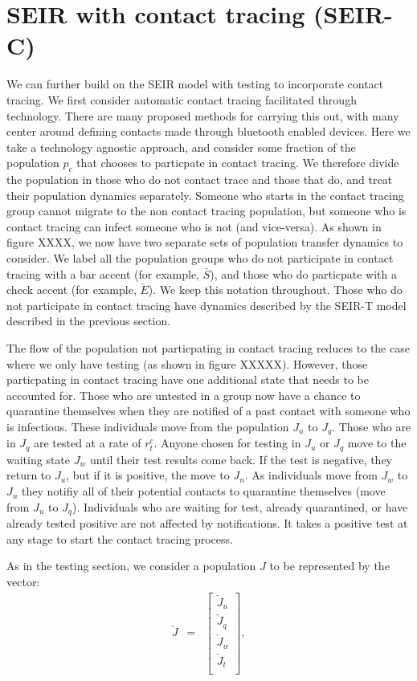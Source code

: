 \documentclass[notitlepage, superscriptaddress]{revtex4-2}
\begin{document}
\section{SEIR with contact tracing (SEIR-C)}
We can further build on the SEIR model with testing to incorporate contact tracing. We first consider automatic contact tracing facilitated through technology. There are many proposed methods for carrying this out, with many center around defining contacts made through bluetooth enabled devices. Here we take a technology agnostic approach, and consider some fraction of the population $p_{c}$ that chooses to particpate in contact tracing. We therefore divide the population in those who do not contact trace and those that do, and treat their population dynamics separately. Someone who starts in the contact tracing group cannot migrate to the non contact tracing population, but someone who is contact tracing can infect someone who is not (and vice-versa). As shown in figure XXXX, we now have two separate sets of population transfer dynamics to consider. We label all the population groups who do not participate in contact tracing with a bar accent (for example, $\bar{S}$), and those who do particpate with a check accent (for example, $\check{E}$). We keep this notation throughout. Those who do not participate in contact tracing have dynamics described by the SEIR-T model described in the previous section.

The flow of the population not particpating in contact tracing reduces to the case where we only have testing (as shown in figure XXXXX). However, those particpating in contact tracing have one additional state that needs to be accounted for. Those who are untested in a group now have a chance to quarantine themselves when they are notified of a past contact with someone who is infectious. These individuals move from the population $J_{u}$ to $J_{q}$. Those who are in $J_{q}$ are tested at a rate of $r^{c}_{t}$. Anyone chosen for testing in $J_{u}$ or $J_{q}$ move to the waiting state $J_{w}$ until their test results come back. If the test is negative, they return to $J_{u}$, but if it is positive, the move to $J_{n}$. As individuals move from $J_{w}$ to $J_{n}$ they notifiy all of their potential contacts to quarantine themselves (move from $J_{u}$ to $J_{q}$). Individuals who are waiting for test, already quarantined, or have already tested positive are not affected by notifications. It takes a positive test at any stage to start the contact tracing process.

As in the testing section, we consider a population $J$ to be represented by the vector:
\begin{eqnarray}
\check{J} &=& 
    \begin{bmatrix}
    \check{J}_{u} \\
    \check{J}_{q} \\
    \check{J}_{w} \\
    \check{J}_{t} \\
    \end{bmatrix},
\end{eqnarray}
\end{document}
